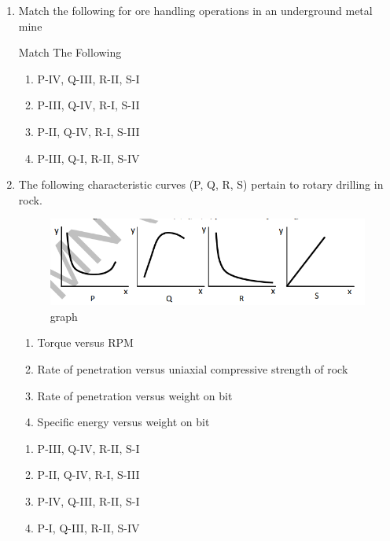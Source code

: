\documentclass[journal,12pt,onecolumn]{IEEEtran}
\theoremstyle{remark}
\begin{document}
\begin{enumerate}
\hfill{}
\begin{multicols}{4}
\begin{enumerate}
\item $-5$
\item $+5$
\item $-2$
\item $+2$
\end{enumerate}
\end{multicols}
\item Match the following for ore handling operations in an underground metal mine
\begin{table}[H]
  \centering
  \caption{Match The Following}
  
  \label{tab:table1}
\end{table}
\begin{multicols}{2}
\begin{enumerate}
\item P-IV, Q-III, R-II, S-I
\item P-III, Q-IV, R-I, S-II
\item P-II, Q-IV, R-I, S-III
\item P-III, Q-I, R-II, S-IV
\end{enumerate}
\end{multicols}

\item The following characteristic curves (P, Q, R, S) pertain to rotary drilling in rock. 
\begin{figure}[H]
  \centering
  \includegraphics[width=0.4\columnwidth]{figs/Graph.png}
  \caption{graph}
  \label{fig:37}
\end{figure}
\begin{enumerate}
    \item Torque versus RPM
    \item Rate of penetration versus uniaxial compressive strength of rock
    \item Rate of penetration versus weight on bit
    \item Specific energy versus weight on bit
\end{enumerate}

\hfill{}
\begin{enumerate}
\item P-III, Q-IV, R-II, S-I
\item P-II, Q-IV, R-I, S-III
\item P-IV, Q-III, R-II, S-I
\item P-I, Q-III, R-II, S-IV
\end{enumerate}


\end{enumerate}
\end{document}
